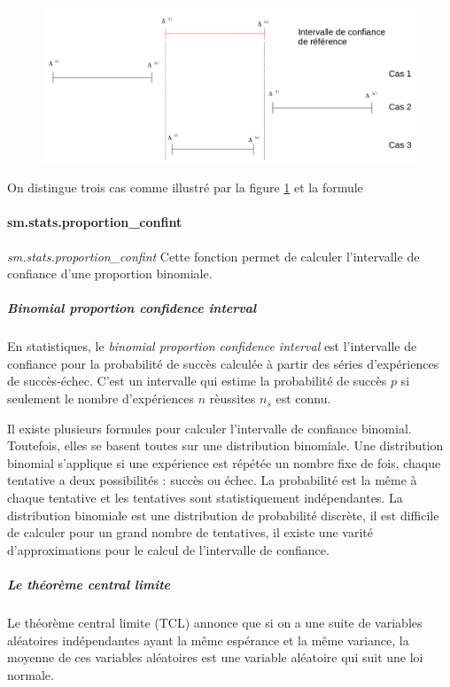\documentclass[]{report}
\begin{document}
\begin{figure}[H]
\centering
\includegraphics[width=1\linewidth]{illustrations/illustration-cas-intervalles-deconfiance}
\caption{}
\label{fig:illustration-cas-intervalles-deconfiance}
\end{figure}

On distingue trois cas comme illustré par la figure \ref{fig:illustration-cas-intervalles-deconfiance} et la formule 
 \paragraph{sm.stats.proportion\_confint}
\textit{sm.stats.proportion\_confint}
Cette fonction permet de calculer l'intervalle de confiance d'une proportion binomiale.

\subparagraph{Binomial proportion confidence interval}
En statistiques, le \textit{binomial proportion confidence interval} est l'intervalle de confiance pour la probabilité de succès calculée à partir des séries d'expériences de succès-échec. C'est un intervalle qui estime la probabilité de succès $p$ si seulement le nombre d'expériences $n$ rèussites $n_s$ est connu.

Il existe plusieurs formules pour calculer l'intervalle de confiance binomial. Toutefois, elles se basent toutes sur une distribution binomiale.  Une distribution binomial s'applique si une expérience est répétée un nombre fixe de fois, chaque tentative a deux possibilités : succès ou échec. La probabilité est la même à chaque tentative et les tentatives sont statistiquement indépendantes. La distribution binomiale est une distribution de probabilité discrète, il est difficile de calculer pour un grand nombre de tentatives, il existe une varité d'approximations pour le calcul de l'intervalle de confiance.


\subparagraph{Le théorème central limite}

Le théorème central limite (TCL) annonce que si on a une suite de variables aléatoires indépendantes ayant la même espérance et la même variance, la moyenne de ces variables aléatoires est une variable aléatoire qui suit une loi normale. 
\end{document}

